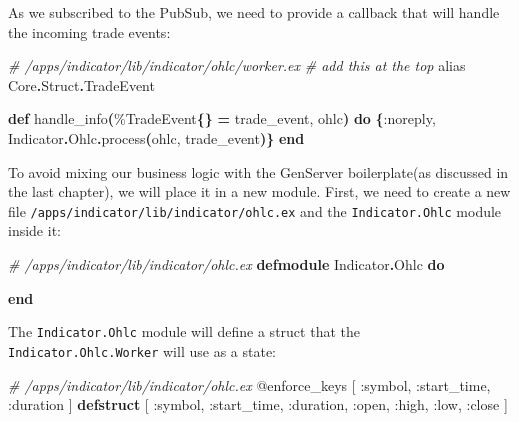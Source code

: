 \documentclass[
  oneside]{book}
\newenvironment{Shaded}{\begin{snugshade}}{\end{snugshade}}
\newcommand{\CommentTok}[1]{\textcolor[rgb]{0.56,0.35,0.01}{\textit{#1}}}
\newcommand{\ConstantTok}[1]{\textcolor[rgb]{0.56,0.35,0.01}{#1}}
\newcommand{\FunctionTok}[1]{\textcolor[rgb]{0.13,0.29,0.53}{\textbf{#1}}}
\newcommand{\ImportTok}[1]{#1}
\newcommand{\KeywordTok}[1]{\textcolor[rgb]{0.13,0.29,0.53}{\textbf{#1}}}
\newcommand{\NormalTok}[1]{#1}
\newcommand{\OperatorTok}[1]{\textcolor[rgb]{0.81,0.36,0.00}{\textbf{#1}}}
\newcommand{\OtherTok}[1]{\textcolor[rgb]{0.56,0.35,0.01}{#1}}
\newcommand{\VariableTok}[1]{\textcolor[rgb]{0.00,0.00,0.00}{#1}}
\begin{document}
As we subscribed to the PubSub, we need to provide a callback that will handle the incoming trade events:

\begin{Shaded}
\begin{Highlighting}[]
\CommentTok{\# /apps/indicator/lib/indicator/ohlc/worker.ex}
  \CommentTok{\# add this at the top}
  \ImportTok{alias} \ConstantTok{Core}\OperatorTok{.}\ConstantTok{Struct}\OperatorTok{.}\ConstantTok{TradeEvent}


  \KeywordTok{def}\NormalTok{ handle\_info}\FunctionTok{(}\NormalTok{\%}\ConstantTok{TradeEvent}\FunctionTok{\{\}} \OperatorTok{=}\NormalTok{ trade\_event, ohlc}\FunctionTok{)} \KeywordTok{do}
    \FunctionTok{\{}\VariableTok{:noreply}\NormalTok{, }\ConstantTok{Indicator}\OperatorTok{.}\ConstantTok{Ohlc}\OperatorTok{.}\NormalTok{process}\FunctionTok{(}\NormalTok{ohlc, trade\_event}\FunctionTok{)\}}
  \KeywordTok{end}
\end{Highlighting}
\end{Shaded}

To avoid mixing our business logic with the GenServer boilerplate(as discussed in the last chapter), we will place it in a new module. First, we need to create a new file \texttt{/apps/indicator/lib/indicator/ohlc.ex} and the \texttt{Indicator.Ohlc} module inside it:

\begin{Shaded}
\begin{Highlighting}[]
\CommentTok{\# /apps/indicator/lib/indicator/ohlc.ex}
\KeywordTok{defmodule} \ConstantTok{Indicator}\OperatorTok{.}\ConstantTok{Ohlc} \KeywordTok{do}

\KeywordTok{end}
\end{Highlighting}
\end{Shaded}

The \texttt{Indicator.Ohlc} module will define a struct that the \texttt{Indicator.Ohlc.Worker} will use as a state:

\begin{Shaded}
\begin{Highlighting}[]
\CommentTok{\# /apps/indicator/lib/indicator/ohlc.ex}
  \OtherTok{@enforce\_keys} \OtherTok{[}
    \VariableTok{:symbol}\NormalTok{,}
    \VariableTok{:start\_time}\NormalTok{,}
    \VariableTok{:duration}
  \OtherTok{]}
  \KeywordTok{defstruct} \OtherTok{[}
    \VariableTok{:symbol}\NormalTok{,}
    \VariableTok{:start\_time}\NormalTok{,}
    \VariableTok{:duration}\NormalTok{,}
    \VariableTok{:open}\NormalTok{,}
    \VariableTok{:high}\NormalTok{,}
    \VariableTok{:low}\NormalTok{,}
    \VariableTok{:close}
  \OtherTok{]}
\end{Highlighting}
\end{Shaded}
\end{document}
